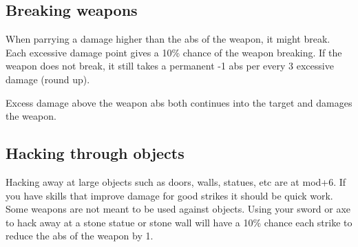 %


\subsection*{Breaking weapons}
When parrying a damage higher than the abs of the weapon, it might break.
Each excessive damage point gives a 10\% chance of the weapon breaking.
If the weapon does not break, it still takes a permanent -1 abs per every 3 excessive damage (round up).

Excess damage above the weapon abs both continues into the target and damages the weapon.


%


\subsection*{Hacking through objects}
Hacking away at large objects such as doors, walls, statues, etc are at mod+6. If you have skills that improve damage for good strikes it should be quick work.
Some weapons are not meant to be used against objects. Using your sword or axe to hack away at a stone statue or stone wall will have a 10\% chance each strike to reduce the abs of the weapon by 1.

